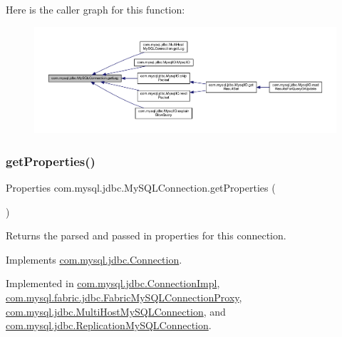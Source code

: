 Here is the caller graph for this function\+:
\nopagebreak
\begin{figure}[H]
\begin{center}
\leavevmode
\includegraphics[width=350pt]{interfacecom_1_1mysql_1_1jdbc_1_1_my_s_q_l_connection_a3faf787772351caedf8e95f28c09c4cd_icgraph}
\end{center}
\end{figure}
\mbox{\label{interfacecom_1_1mysql_1_1jdbc_1_1_my_s_q_l_connection_a494cb1c438fb5e65b5fb9916c8331191}} 
\subsubsection{\texorpdfstring{get\+Properties()}{getProperties()}}
{\footnotesize\ttfamily Properties com.\+mysql.\+jdbc.\+My\+S\+Q\+L\+Connection.\+get\+Properties (\begin{DoxyParamCaption}{ }\end{DoxyParamCaption})}

Returns the parsed and passed in properties for this connection. 

Implements \mbox{\hyperlink{interfacecom_1_1mysql_1_1jdbc_1_1_connection_ad594d416be84166aff54270aa66b3d71}{com.\+mysql.\+jdbc.\+Connection}}.



Implemented in \mbox{\hyperlink{classcom_1_1mysql_1_1jdbc_1_1_connection_impl_a12d59167c09571dff544e96ff65b302b}{com.\+mysql.\+jdbc.\+Connection\+Impl}}, \mbox{\hyperlink{classcom_1_1mysql_1_1fabric_1_1jdbc_1_1_fabric_my_s_q_l_connection_proxy_aad58676ee781e3c04ec97545c95430cc}{com.\+mysql.\+fabric.\+jdbc.\+Fabric\+My\+S\+Q\+L\+Connection\+Proxy}}, \mbox{\hyperlink{classcom_1_1mysql_1_1jdbc_1_1_multi_host_my_s_q_l_connection_a06880fce49c4791eca1bf52761c51ab4}{com.\+mysql.\+jdbc.\+Multi\+Host\+My\+S\+Q\+L\+Connection}}, and \mbox{\hyperlink{classcom_1_1mysql_1_1jdbc_1_1_replication_my_s_q_l_connection_a93f7c5bbec567b742e4f9f94b81f1493}{com.\+mysql.\+jdbc.\+Replication\+My\+S\+Q\+L\+Connection}}.


